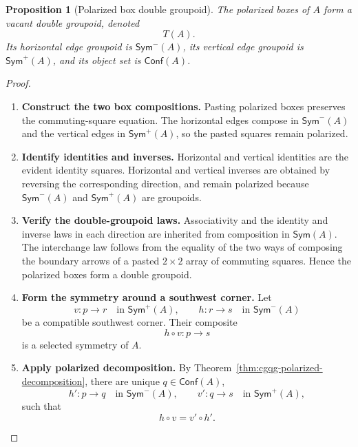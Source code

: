 \documentclass[oneside]{article}
\newcommand{\Conf}{\mathsf{Conf}}
\newcommand{\Sym}{\mathsf{Sym}}
\theoremstyle{plain}
\newtheorem{proposition}[theorem]{Proposition}
\theoremstyle{definition}
\theoremstyle{remark}
\begin{document}
\begin{proposition}[Polarized box double groupoid]
\label{prop:cgqg-game-vacant-boxes}
    The polarized boxes of \(A\) form a vacant double groupoid, denoted
    \begin{equation}
        T(A).
        \label{eq:cgqg-game-resource-double-groupoid}
    \end{equation}
    Its horizontal edge groupoid is \(\Sym^-(A)\), its vertical edge groupoid is \(\Sym^+(A)\), and its object set is \(\Conf(A)\).
\end{proposition}
\begin{proof}
    \leavevmode
    \begin{enumerate}[beginpenalty=10000]
        \item \textbf{Construct the two box compositions.}
        Pasting polarized boxes preserves the commuting-square equation.
        The horizontal edges compose in \(\Sym^-(A)\) and the vertical
        edges in \(\Sym^+(A)\), so the pasted squares remain polarized.

        \item \textbf{Identify identities and inverses.} Horizontal and vertical identities are the evident identity squares. Horizontal and vertical inverses are obtained by reversing the corresponding direction, and remain polarized because \(\Sym^-(A)\) and \(\Sym^+(A)\) are groupoids.

        \item \textbf{Verify the double-groupoid laws.} Associativity and the identity and inverse laws in each direction are inherited from composition in \(\Sym(A)\). The interchange law follows from the equality of the two ways of composing the boundary arrows of a pasted \(2\times2\) array of commuting squares. Hence the polarized boxes form a double groupoid.

        \item \textbf{Form the symmetry around a southwest corner.} Let
        \[
            v:p\longrightarrow r
            \quad\text{in }\Sym^+(A),
            \qquad
            h:r\longrightarrow s
            \quad\text{in }\Sym^-(A)
        \]
        be a compatible southwest corner. Their composite
        \[
            h\circ v:p\longrightarrow s
        \]
        is a selected symmetry of \(A\).

        \item \textbf{Apply polarized decomposition.} By Theorem~\ref{thm:cgqg-polarized-decomposition}, there are unique
        \(q\in\Conf(A)\),
        \[
            h':p\longrightarrow q
            \quad\text{in }\Sym^-(A),
            \qquad
            v':q\longrightarrow s
            \quad\text{in }\Sym^+(A),
        \]
        such that
        \[
            h\circ v=v'\circ h'.
        \]


\end{enumerate}
\end{proof}
\end{document}
